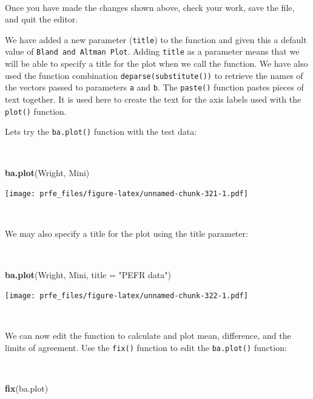 \documentclass[12pt,a4paper]{book}
\newenvironment{Shaded}{\begin{snugshade}}{\end{snugshade}}
\newcommand{\KeywordTok}[1]{\textcolor[rgb]{0.13,0.29,0.53}{\textbf{#1}}}
\newcommand{\DataTypeTok}[1]{\textcolor[rgb]{0.13,0.29,0.53}{#1}}
\newcommand{\StringTok}[1]{\textcolor[rgb]{0.31,0.60,0.02}{#1}}
\newcommand{\NormalTok}[1]{#1}
\theoremstyle{definition}
\theoremstyle{definition}
\theoremstyle{definition}
\theoremstyle{remark}
\begin{document}
~

Once you have made the changes shown above, check your work, save the
file, and quit the editor.

We have added a new parameter (\texttt{title}) to the function and given
this a default value of \texttt{Bland\ and\ Altman\ Plot}. Adding
\texttt{title} as a parameter means that we will be able to specify a
title for the plot when we call the function. We have also used the
function combination \texttt{deparse(substitute())} to retrieve the
names of the vectors passed to parameters \texttt{a} and \texttt{b}. The
\texttt{paste()} function pastes pieces of text together. It is used
here to create the text for the axis labels used with the
\texttt{plot()} function.

Lets try the \texttt{ba.plot()} function with the test data:

~

\begin{Shaded}
\begin{Highlighting}[]
\KeywordTok{ba.plot}\NormalTok{(Wright, Mini)}
\end{Highlighting}
\end{Shaded}

\texttt{[image: prfe\_files/figure-latex/unnamed-chunk-321-1.pdf]}

~

We may also specify a title for the plot using the title parameter:

~

\begin{Shaded}
\begin{Highlighting}[]
\KeywordTok{ba.plot}\NormalTok{(Wright, Mini, }\DataTypeTok{title =} \StringTok{"PEFR data"}\NormalTok{)}
\end{Highlighting}
\end{Shaded}

\texttt{[image: prfe\_files/figure-latex/unnamed-chunk-322-1.pdf]}

~

We can now edit the function to calculate and plot mean, difference, and
the limits of agreement. Use the \texttt{fix()} function to edit the
\texttt{ba.plot()} function:

~

\begin{Shaded}
\begin{Highlighting}[]
\KeywordTok{fix}\NormalTok{(ba.plot)}
\end{Highlighting}
\end{Shaded}
\end{document}

